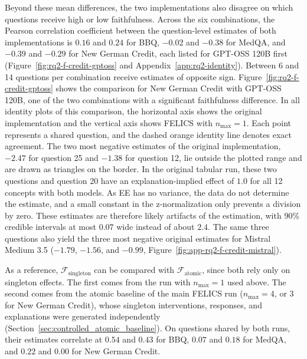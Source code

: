 Beyond these mean differences, the two implementations also disagree on which questions receive high or low faithfulness. Across the six combinations, the Pearson correlation coefficient between the question-level estimates of both implementations is $0.16$ and $0.24$ for BBQ, $-0.02$ and $-0.38$ for MedQA, and $-0.39$ and $-0.29$ for New German Credit, each listed for GPT-OSS 120B first (Figure~\ref{fig:rq2-f-credit-gptoss} and Appendix~\ref{app:rq2-identity}). Between 6 and 14 questions per combination receive estimates of opposite sign. Figure~\ref{fig:rq2-f-credit-gptoss} shows the comparison for New German Credit with GPT-OSS 120B, one of the two combinations with a significant faithfulness difference. In all identity plots of this comparison, the horizontal axis shows the original implementation and the vertical axis shows FELICS with $n_{\max}=1$. Each point represents a shared question, and the dashed orange identity line denotes exact agreement. The two most negative estimates of the original implementation, $-2.47$ for question 25 and $-1.38$ for question 12, lie outside the plotted range and are drawn as triangles on the border. In the original tabular run, these two questions and question 20 have an explanation-implied effect of $1.0$ for all 12 concepts with both models. As EE has no variance, the data do not determine the estimate, and a small constant in the z-normalization only prevents a division by zero. These estimates are therefore likely artifacts of the estimation, with 90\% credible intervals at most $0.07$ wide instead of about $2.4$. The same three questions also yield the three most negative original estimates for Mistral Medium 3.5 ($-1.79$, $-1.56$, and $-0.99$, Figure~\ref{fig:app-rq2-f-credit-mistral}).

As a reference, $\mathcal{F}_{\mathrm{singleton}}$ can be compared with $\mathcal{F}_{\mathrm{atomic}}$, since both rely only on singleton effects. The first comes from the run with $n_{\max}=1$ used above. The second comes from the atomic baseline of the main FELICS run ($n_{\max}=4$, or $3$ for New German Credit), whose singleton interventions, responses, and explanations were generated independently (Section~\ref{sec:controlled_atomic_baseline}). On questions shared by both runs, their estimates correlate at $0.54$ and $0.43$ for BBQ, $0.07$ and $0.18$ for MedQA, and $0.22$ and $0.00$ for New German Credit.

